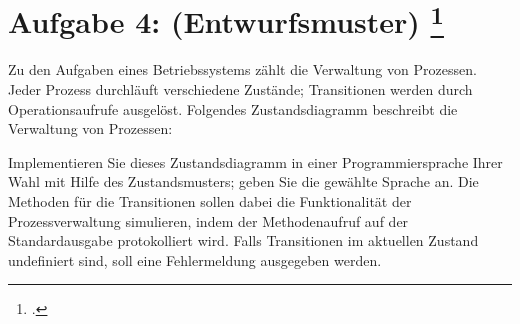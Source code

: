 \documentclass{lehramt-informatik-aufgabe}
\begin{document}

\section{Aufgabe 4: (Entwurfsmuster)
\footcite[Thema 1 Teilaufgabe 1 Aufgabe 4]{examen:66116:2019:09}
}

Zu den Aufgaben eines Betriebssystems zählt die Verwaltung von
Prozessen. Jeder Prozess durchläuft verschiedene Zustände; Transitionen
werden durch Operationsaufrufe ausgelöst. Folgendes
Zustandsdiagramm beschreibt die Verwaltung von
Prozessen:

\begin{center}
\end{center}

\noindent
Implementieren Sie dieses
Zustandsdiagramm in einer Programmiersprache Ihrer Wahl mit Hilfe des
Zustandsmusters; geben Sie die gewählte Sprache an. Die Methoden für die
Transitionen sollen dabei die Funktionalität der Prozessverwaltung
simulieren, indem der Methodenaufruf auf der Standardausgabe
protokolliert wird. Falls Transitionen im aktuellen Zustand undefiniert
sind, soll eine Fehlermeldung ausgegeben werden.

\begin{liExkurs}

\liEntwurfsZustandUml


\liEntwurfsZustandAkteure
\end{liExkurs}
\end{document}
